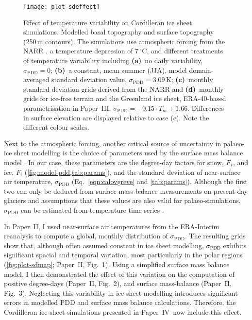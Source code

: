 \documentclass[a4paper]{kappa}
\newcommand{\sPDD}[0]{\sigma_{\mathrm{PDD}}}
\newcommand{\unit}[1]{\ensuremath{\mathrm{#1}}}
\newcommand{\degree}[0]{\ensuremath{^{\circ}}}
\newcommand{\degC}[0]{\unit{{\degree}C}}
\newcommand{\PSDV}[0]{Paper~II}     %
\newcommand{\PSDP}[0]{Paper~III}    %
\newcommand{\CCYC}[0]{Paper~IV}     %
\begin{document}
\begin{figure}
  \texttt{[image: plot-sdeffect]}
  \caption{Effect of temperature variability on Cordilleran ice sheet
           simulations. Modelled basal topography and surface topography
           (250\,m contours). The simulations use atmospheric forcing from the
           NARR \citep{Mesinger.etal.2006}, a temperature depression of
           7\,\degC, and different treatments of temperature variability
           including
           \textbf{(a)}~no daily variability, $\sPDD=0$;
           \textbf{(b)}~a constant, mean summer (JJA), model domain-averaged
           standard deviation value, $\sPDD=3.09$\,K;
           \textbf{(c)}~monthly standard deviation grids derived from the NARR
           and
           \textbf{(d)}~monthly grids for ice-free terrain and the
           Greenland ice sheet, ERA-40-based \citep{Uppala.etal.2005}
           parametrisation in \PSDP, ${\sPDD=-0.15\cdot{T_m}+1.66}$.
           Differences in surface elevation are displayed relative to case (c).
           Note the different colour scales.}
  \label{fig:plot-sdeffect}
\end{figure}

Next to the atmospheric forcing, another critical source of uncertainty in
palaeo-ice sheet modelling is the choice of parameters used by the surface mass
balance model \citep[e.g.,][]{Hebeler.etal.2008}. In our case, these parameters
are the degree-day factors for snow, $F_s$, and ice, $F_i$
(\cref{fig:model-pdd,tab:params}), and the standard deviation of
near-surface air temperature, $\sPDD$ (Eq.~\ref{eqn:calovgreve} and
\cref{tab:params}). Although the first two can only be
deduced from surface mass-balance measurements on present-day glaciers
\citep[e.g.,][]{Shea.etal.2009} and assumptions that these values are also
valid for palaeo-simulations, $\sPDD$ can be estimated from temperature time
series \citep[e.g.,][]{Fausto.etal.2011}.

In \PSDV, I used near-surface air temperatures from the ERA-Interim reanalysis
\citep{Dee.etal.2011} to compute a global, monthly distribution of $\sPDD$. The
resulting grids show that, although often assumed constant in ice sheet
modelling, $\sPDD$ exhibits significant spacial and temporal variation, most
particularly in the polar regions (\cref{fig:plot-sdmap}; \PSDV, Fig.~1). Using
a simplified surface mass balance model, I then demonstrated the effect of this
variation on the computation of positive degree-days (\PSDV, Fig.~2), and
surface mass-balance (\PSDV, Fig.~3). Neglecting this variability in ice sheet
modelling introduces significant errors in modelled PDD and surface mass
balance calculations. Therefore, the Cordilleran ice sheet simulations
presented in \CCYC\ now include this effect.
\end{document}
